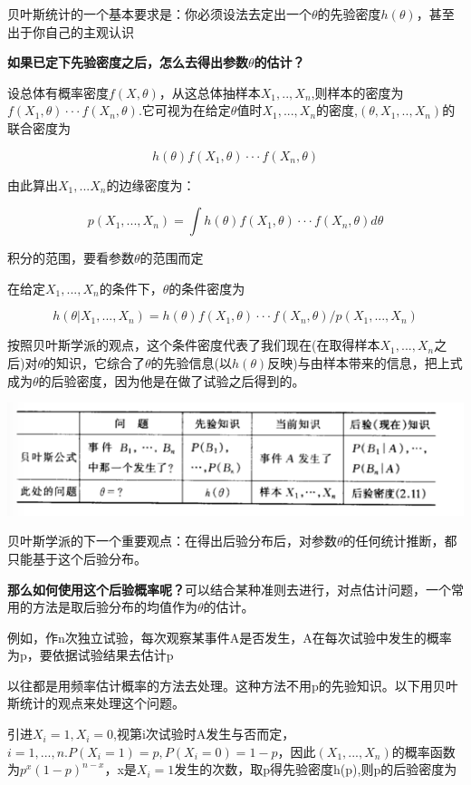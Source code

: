 \documentclass{ctexart}
\begin{document}
	贝叶斯统计的一个基本要求是：你必须设法去定出一个\(\theta\)的先验密度\(h(\theta)\)，甚至出于你自己的主观认识
	
	\textbf{如果已定下先验密度之后，怎么去得出参数\(\theta\)的估计？}
	
	设总体有概率密度\(f(X, \theta)\)，从这总体抽样本\(X_1,..,X_n\),则样本的密度为\(f(X_1, \theta)···f(X_n,\theta)\).它可视为在给定\(\theta\)值时\(X_1,...,X_n\)的密度,\((\theta,X_1,..,X_n)\)的联合密度为
	
	\[h(\theta)f(X_1, \theta)···f(X_n,\theta)\]
	
	由此算出\(X_1,...X_n\)的边缘密度为：
	
	\[p(X_1,...,X_n)=\int h(\theta)f(X_1, \theta)···f(X_n,\theta)d\theta\]
	
	积分的范围，要看参数\(\theta\)的范围而定
	
	在给定\(X_1,...,X_n\)的条件下，\(\theta\)的条件密度为
	
	\[h(\theta|X_1,...,X_n)=h(\theta)f(X_1, \theta)···f(X_n,\theta)/p(X_1,...,X_n)\]
	
	按照贝叶斯学派的观点，这个条件密度代表了我们现在(在取得样本\(X_1,...,X_n\)之后)对\(\theta\)的知识，它综合了\(\theta\)的先验信息(以\(h(\theta)\)反映)与由样本带来的信息，把上式成为\(\theta\)的后验密度，因为他是在做了试验之后得到的。
	
	\includegraphics[width=0.8\linewidth]{pic/bayes_estimation}
	
	贝叶斯学派的下一个重要观点：在得出后验分布后，对参数\(\theta\)的任何统计推断，都只能基于这个后验分布。
	
	\textbf{那么如何使用这个后验概率呢？}可以结合某种准则去进行，{\color{red}对点估计问题，一个常用的方法是取后验分布的均值作为\(\theta\)的估计}。
	
	例如，作n次独立试验，每次观察某事件A是否发生，A在每次试验中发生的概率为p，要依据试验结果去估计p
	
	以往都是用频率估计概率的方法去处理。这种方法不用p的先验知识。以下用贝叶斯统计的观点来处理这个问题。
	
	引进\(X_i=1, X_i=0\),视第i次试验时A发生与否而定，\(i=1,...,n. P(X_i=1)=p,P(X_i=0)=1-p\)，因此\((X_1,...,X_n)\)的概率函数为\(p^x(1-p)^{n-x}\)，x是\(X_i=1\)发生的次数，取p得先验密度h(p),则p的后验密度为
	
\end{document}
